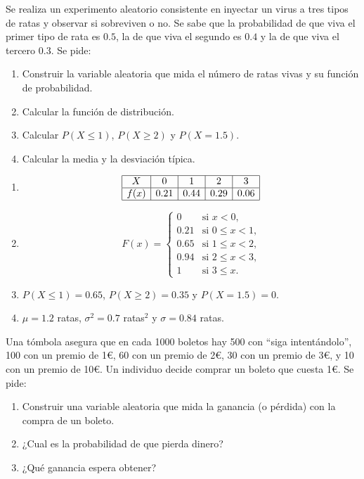 {Se realiza un experimento aleatorio consistente en inyectar un virus a tres tipos de ratas y observar si sobreviven o
no.
Se sabe que la probabilidad de que viva el primer tipo de rata es $0.5$, la de que viva el segundo es $0.4$ y la de
que viva el tercero $0.3$.
Se pide:
\begin{enumerate}
\item Construir la variable aleatoria que mida el número de ratas vivas y su función de probabilidad.
\item Calcular la función de distribución.
\item Calcular $P(X\leq 1)$, $P(X\geq 2)$ y $P(X=1.5)$.
\item Calcular la media y la desviación típica.
\end{enumerate}
}
{
\begin{enumerate}
\item \[
\begin{array}{|c|c|c|c|c|}
\hline
X & 0 & 1 & 2 & 3 \\
\hline
f(x) & 0.21 & 0.44 & 0.29 & 0.06\\
\hline
\end{array}
\]
\item \[
F(x)=
\begin{cases}
0 & \text{si $x<0$,}\\
0.21 & \text{si $0\leq x<1$,}\\
0.65 & \text{si $1\leq x<2$,}\\
0.94 & \text{si $2\leq x<3$,}\\
1 & \text{si $3\leq x$.}
\end{cases}
\]
\item $P(X\leq 1)=0.65$, $P(X\geq 2)=0.35$ y $P(X=1.5)=0$.
\item $\mu=1.2$ ratas, $\sigma^2=0.7$ ratas$^2$ y $\sigma=0.84$ ratas.
\end{enumerate}
}
{}


{Una tómbola asegura que en cada 1000 boletos hay 500 con ``siga intentándolo'', 100 con un premio de 1\euro, 60 con un premio de 2\euro, 30 con un premio de 3\euro, y 10 con un premio de 10\euro. Un individuo decide comprar un boleto que cuesta 1\euro. Se pide:

\begin{enumerate}
\item Construir una variable aleatoria que mida la ganancia (o pérdida) con la compra de un boleto.
\item ¿Cual es la probabilidad de que pierda dinero?
\item ¿Qué ganancia espera obtener?
\end{enumerate}
}
{}
{}


